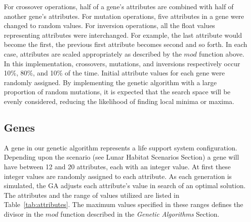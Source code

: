 \documentclass[submit]{aiaa}
\begin{document}
For crossover operations, half of a gene's attributes are combined with half of another gene's attributes.  
For mutation operations, five attributes in a gene were changed to random values.  
For inversion operations, all the float values representing attributes were interchanged.
For example, the last attribute would become the first, the previous first attribute becomes second and so forth.
In each case, attributes are scaled appropriately as described by the $mod$ function above.
In this implementation, crossovers, mutations, and inversions respectively occur 10\%, 80\%, and 10\% of the time.
Initial attribute values for each gene were randomly assigned.
By implementing the genetic algorithm with a large proportion of random mutations, it is expected that the search space will be evenly considered, reducing the likelihood of finding local minima or maxima.

\subsection{Genes}
\label{sec:gene}

A gene in our genetic algorithm represents a life support system configuration.
Depending upon the scenario (see Lunar Habitat Scenarios Section)
 a gene will have between 12 and 20 attributes, each with an integer value.  
At first these integer values are randomly assigned to each attribute.  
As each generation is simulated, the GA adjusts each attribute's value in search of an optimal solution.  
The attributes and the range of values utilized are listed in Table~\ref{tab:attributes}.
The maximum values specified in these ranges defines the divisor in the $mod$ function described in the \emph{Genetic Algorithms} Section.
\end{document}
